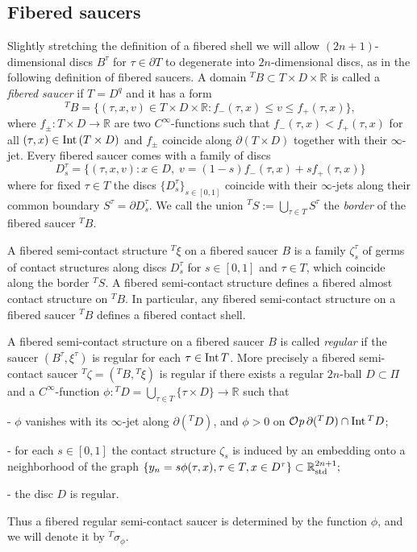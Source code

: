 \documentclass[12pt]{paper}
\theoremstyle{plain}
\theoremstyle{definition}
\newcommand{\p}{\partial}
\newcommand{\R}{{\mathbb{R}}}
\newcommand{\Int}{{\rm Int\,}} %
\newcommand{\std}{{\rm std}}
\def\Op{{\mathcal O}{\it p}\,}
\numberwithin{figure}{section}
\begin{document}
    
 \subsection{Fibered saucers}\label{sec:fibered-saucer}
    
Slightly stretching the definition of a fibered shell we  will allow $(2n+1)$-dimensional discs $B^\tau$ for $\tau\in \p T$ to degenerate into $2n$-dimensional discs, as in the following definition of fibered saucers.
  A domain ${}^TB \subset T \times D\times\R$   is called a {\it fibered saucer} if $T=D^q$ and
   it has a form
 $${}^TB=\{(\tau, x,v)\in T\times D\times\R: f_-(\tau,x)\leq v\leq f_+(\tau,x)\},$$
 where
  $f_\pm:T\times D\to\R$ are two   $C^\infty$-functions such that
 $f_-(\tau,x)<f_+(\tau,x)$ for all $(\tau,x) \in \Int(T \times D)$ and
 $f_\pm$ coincide along $\p\left(T \times D\right) $ together with their $\infty$-jet.
  Every fibered saucer comes with a family of discs 
 $$
 D^\tau_s=\{(\tau, x,v): x\in D,\; v=(1-s)f_-(\tau,x)+sf_+(\tau, x)\}
 $$
 where for fixed $\tau\in T$ the discs $\{D^\tau_s\}_{s \in [0,1]}$ coincide with their $\infty$-jets along  their common boundary 
 $S^\tau=\p D^\tau_s$. We call the union ${}^TS:=\bigcup_{\tau\in T}S^\tau$    the {\em border} of the  fibered saucer ${}^TB$.
  
 A fibered semi-contact structure ${}^T\xi$ on a fibered saucer  $B$ is a family $\zeta^\tau_s$ of germs of contact structures along discs $D^\tau_s $ for $s\in[0,1]$ and $\tau\in T$, which coincide along the border ${}^TS$. A fibered semi-contact structure defines a fibered almost contact structure on ${}^TB$. In particular, any fibered semi-contact structure on a fibered saucer ${}^TB$ defines a fibered contact shell.

    A fibered semi-contact structure on a fibered saucer $B$ is called 
   {\em regular} if the saucer $(B^\tau,\xi^\tau)$ is regular for each $\tau\in\Int T$.
  More precisely  a fibered    semi-contact saucer  ${}^T\zeta=\left({}^TB, {}^T\xi\right)$ is regular if there exists a regular $2n$-ball   $D\subset\Pi$   and a  $C^\infty$-function  $\phi:{}^TD=\bigcup\limits_{\tau\in T}\{\tau\times D\}\to\R $   such that
   \begin{description}
   \item{-} $\phi$ vanishes with its $\infty$-jet along $\p ({}^TD)$, and
  $\phi >0$ on  $\Op \p({}^T D)\cap\Int {}^T D$;
   \item{-}  for each $s\in[0,1]$ the contact structure $\zeta_s$ is induced by an  embedding  onto a neighborhood of the graph
   $\{y_n=s\phi(\tau,x), \tau\in T, x\in D^\tau\}\subset\R^{2n+1}_\std;$
   \item{-} the disc $D$ is regular.
   \end{description}
    Thus a  fibered regular semi-contact saucer is determined by the function $\phi$,  and we will denote it by ${}^T\sigma_\phi$. 
  
\end{document}

